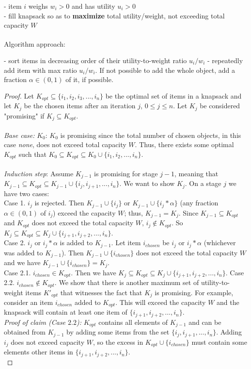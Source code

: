 \documentclass{article}
\newcommand\tab[1][1cm]{\hspace*{#1}}
\begin{document}
- item $i$ weighs $w_i > 0$ and has utility $u_i > 0$\\
- fill knapsack so as to \textbf{maximize} total utility/weight, not exceeding total capacity $W$\\
\\Algorithm approach:
\begin{algorithmic}
\State - sort items in decreasing order of their utility-to-weight ratio $u_i/w_i$
\State - repeatedly add item with max ratio $u_i/w_i$. If not possible to add the whole object, add a fraction $\alpha \in (0, 1)$ of it, if possible.
\end{algorithmic}
\begin{proof}
Let $K_{opt} \subseteq \{i_1, i_2, i_3,..., i_n\}$ be the optimal set of items in a knapsack and let $K_j$ be the chosen items after an iteration $j$, $0 \leq j \leq n$. Let $K_j$ be considered "promising" if $K_j \subseteq K_{opt}$.\\\\
\textit{Base case:} $K_0$: $K_0$ is promising since the total number of chosen objects, in this case \textit{none}, does not exceed total capacity $W$. Thus, there exists some optimal $K_{opt}$ such that $K_0 \subseteq K_{opt} \subseteq K_0 \cup \{ i_1, i_2, ..., i_n\}$.\\
\\
\textit{Induction step}: Assume $K_{j-1}$ is promising for stage $j-1$, meaning that $K_{j-1} \subseteq K_{opt} \subseteq K_{j-1} \cup \{i_j, i_{j+1}, ..., i_n \}$. We want to show $K_j$. On a stage $j$ we have two cases:\\
\tab Case 1. $i_j$ is rejected. Then $K_{j-1} \cup \{ i_j \}$ or $K_{j-1} \cup \{ i_j * \alpha \}$  (any fraction $\alpha \in (0, 1)$ of $i_j$) exceed the capacity $W$; thus, $K_{j-1} = K_j$. Since $K_{j-1} \subseteq K_{opt}$ and $K_{opt}$ does not exceed the total capacity $W$, $i_j \notin K_{opt}$. So $K_j \subseteq K_{opt} \subseteq K_j \cup \{ i_{j+1}, i_{j+2}, ..., i_n\}$.\\
\tab Case 2. $i_j$  or $i_j * \alpha$ is added to $K_{j-1}$. Let item $i_{chosen}$ be $i_j$  or $i_j * \alpha$ (whichever was added to $K_{j-1}$). Then $K_{j-1} \cup \{i_{chosen}\}$ does not exceed the total capacity $W$ and we have $K_{j-1} \cup \{i_{chosen}\} = K_j$.\\
\tab Case 2.1. $i_{chosen} \in K_{opt}$. Then we have $K_j \subseteq K_{opt} \subseteq K_j \cup \{ i_{j+1}, i_{j+2}, ..., i_n\}$.
\tab Case 2.2. $i_{chosen} \notin K_{opt}$. We show that there is another maximum set of utility-to-weight items $K'_{opt}$ that witnesses the fact that $K_j$ is promising. For example, consider an item $i_{chosen}$ added to $K_{opt}$. This will exceed the capacity $W$ and the knapsack will contain at least one item of $\{i_{j+1}, i_{j+2}, ..., i_n\}$. \\
\tab \textit{Proof of claim (Case $2.2$):} $K_{opt}$ contains all elements of $K_{j-1}$ and can be obtained from $K_{j-1}$ by adding some items from the set $\{i_j, i_{j+1}, ..., i_n\}$. Adding $i_j$ does not exceed capacity $W$, so the excess in $K_{opt} \cup \{i_{chosen}\}$ must contain some elements other items in $\{i_{j+1}, i_{j+2}, ..., i_n\}$.\\
\end{proof}
\end{document}
